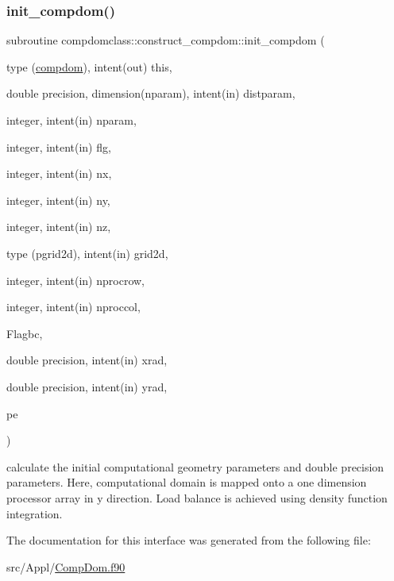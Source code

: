 \subsubsection{\texorpdfstring{init\_compdom()}{init\_compdom()}}
{\footnotesize\ttfamily subroutine compdomclass\+::construct\+\_\+compdom\+::init\+\_\+compdom (\begin{DoxyParamCaption}\item[{type (\mbox{\hyperlink{namespacecompdomclass_structcompdomclass_1_1compdom}{compdom}}), intent(out)}]{this,  }\item[{double precision, dimension(nparam), intent(in)}]{distparam,  }\item[{integer, intent(in)}]{nparam,  }\item[{integer, intent(in)}]{flg,  }\item[{integer, intent(in)}]{nx,  }\item[{integer, intent(in)}]{ny,  }\item[{integer, intent(in)}]{nz,  }\item[{type (pgrid2d), intent(in)}]{grid2d,  }\item[{integer, intent(in)}]{nprocrow,  }\item[{integer, intent(in)}]{nproccol,  }\item[{}]{Flagbc,  }\item[{double precision, intent(in)}]{xrad,  }\item[{double precision, intent(in)}]{yrad,  }\item[{}]{pe }\end{DoxyParamCaption})}



calculate the initial computational geometry parameters and double precision parameters. Here, computational domain is mapped onto a one dimension processor array in y direction. Load balance is achieved using density function integration. 



The documentation for this interface was generated from the following file\+:\begin{DoxyCompactItemize}
\item 
src/\+Appl/\mbox{\hyperlink{_comp_dom_8f90}{Comp\+Dom.\+f90}}\end{DoxyCompactItemize}
